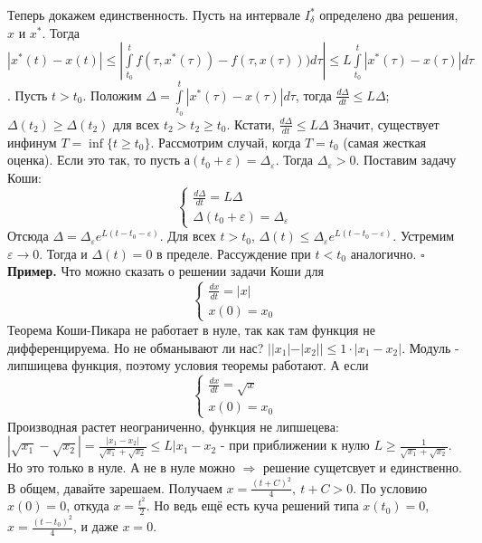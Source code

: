 Теперь докажем единственность. Пусть на интервале  $I^*_\delta$ определено
два решения, $x$ и  $x^*$. Тогда
$|x^*(t)-x(t)|\leqslant \left| \int\limits_{t_0}^{t}f(\tau,x^*(\tau))-
f(\tau,x(\tau))) d\tau \right|\leqslant L \int\limits_{t_0}^{t}|x^*(\tau)-
x(\tau)|d\tau$. Пусть $t>t_0$. Положим  
$\Delta= \int\limits_{t_0}^{t}|x^*(\tau)-x(\tau)|d\tau$, тогда 
$\frac{d\Delta}{dt}\leqslant L\Delta$; $\Delta(t_2)\geqslant\Delta(t_2)$
для всех $t_2>t_2\geqslant t_{0}$. 
Кстати, $\frac{d\Delta}{dt}\leqslant L\Delta$
Значит, существует инфинум 
$T=\inf \{t\geqslant t_0\}$. Рассмотрим случай, когда $T=t_0$ (самая жесткая
оценка). Если это так, то пусть $а(t_0+\varepsilon)=\Delta_\varepsilon$. 
Тогда $\Delta_\varepsilon>0$. Поставим задачу Коши:
$$\begin{cases}
    \frac{d\Delta}{dt}=L\Delta\\ \Delta(t_0+\varepsilon)=\Delta_\varepsilon
\end{cases}$$
Отсюда $\Delta=\Delta_\varepsilon e^{L(t-t_0-\varepsilon)}$. Для всех
$t>t_0$,  $\Delta(t)\leqslant\Delta_\varepsilon e^{L(t-t_0-\varepsilon)}$.
Устремим $\varepsilon\to0$. Тогда и $\Delta(t)=0$ в пределе. 
Рассуждение при $t<t_0$ аналогично. $\square$\\
\textbf{Пример.}  Что можно сказать о решении задачи Коши для
$$\begin{cases}
    \frac{dx}{dt}=|x|\\x(0)=x_0
\end{cases}$$
Теорема Коши-Пикара не работает в нуле, так как там функция не дифференцируема.
Но не обманывают ли нас?
$| |x_1|-|x_2| |\leqslant 1\cdot |x_1-x_2|$. Модуль - липшицева функция, 
поэтому условия теоремы работают. 
А если 
$$\begin{cases}
    \frac{dx}{dt}=\sqrt{x} \\x(0)=x_0
\end{cases}$$
Производная растет неограниченно, функция не липшецева: 
$|\sqrt{x_1}-\sqrt{x_2}|=\frac{|x_1-x_2|}{\sqrt{x_1}+\sqrt{x_2}}\leqslant L
|x_1-x_2$ - при приближении к нулю $L\geqslant\frac{1}{\sqrt{x_1}+\sqrt{x_2}}$.
Но это только в нуле. А не в нуле можно $\Rightarrow$ решение сущетсвует и 
единственно. В общем, давайте зарешаем. Получаем $x=\frac{(t+C)^2}{4},~t+C>0$.
По условию $x(0)=0$, откуда $x=\frac{t^2}{2}$. Но ведь ещё есть куча решений
типа $x(t_0)=0$,  $x=\frac{(t-t_0)^2}{4}$, и даже $x=0$. 




